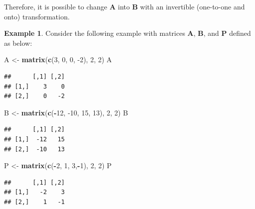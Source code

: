 \documentclass[
]{book}
\newenvironment{Shaded}{\begin{snugshade}}{\end{snugshade}}
\newcommand{\DecValTok}[1]{\textcolor[rgb]{0.00,0.00,0.81}{#1}}
\newcommand{\KeywordTok}[1]{\textcolor[rgb]{0.13,0.29,0.53}{\textbf{#1}}}
\newcommand{\NormalTok}[1]{#1}
\newcommand{\OperatorTok}[1]{\textcolor[rgb]{0.81,0.36,0.00}{\textbf{#1}}}
\newcommand{\StringTok}[1]{\textcolor[rgb]{0.31,0.60,0.02}{#1}}
\theoremstyle{definition}
\theoremstyle{definition}
\newtheorem{example}{Example}[chapter]
\theoremstyle{definition}
\theoremstyle{definition}
\theoremstyle{remark}
\begin{document}
Therefore, it is possible to change \(\mathbf{A}\) into \(\mathbf{B}\) with an invertible (one-to-one and onto) transformation.

\begin{example}

Consider the following example with matrices \(\mathbf{A}\), \(\mathbf{B}\), and \(\mathbf{P}\) defined as below:

\begin{Shaded}
\begin{Highlighting}[]
\NormalTok{A <-}\StringTok{ }\KeywordTok{matrix}\NormalTok{(}\KeywordTok{c}\NormalTok{(}\DecValTok{3}\NormalTok{, }\DecValTok{0}\NormalTok{, }\DecValTok{0}\NormalTok{, }\DecValTok{-2}\NormalTok{), }\DecValTok{2}\NormalTok{, }\DecValTok{2}\NormalTok{)}
\NormalTok{A}
\end{Highlighting}
\end{Shaded}

\begin{verbatim}
##      [,1] [,2]
## [1,]    3    0
## [2,]    0   -2
\end{verbatim}

\begin{Shaded}
\begin{Highlighting}[]
\NormalTok{B <-}\StringTok{ }\KeywordTok{matrix}\NormalTok{(}\KeywordTok{c}\NormalTok{(}\OperatorTok{-}\DecValTok{12}\NormalTok{, }\DecValTok{-10}\NormalTok{, }\DecValTok{15}\NormalTok{, }\DecValTok{13}\NormalTok{), }\DecValTok{2}\NormalTok{, }\DecValTok{2}\NormalTok{)}
\NormalTok{B}
\end{Highlighting}
\end{Shaded}

\begin{verbatim}
##      [,1] [,2]
## [1,]  -12   15
## [2,]  -10   13
\end{verbatim}

\begin{Shaded}
\begin{Highlighting}[]
\NormalTok{P <-}\StringTok{ }\KeywordTok{matrix}\NormalTok{(}\KeywordTok{c}\NormalTok{(}\OperatorTok{-}\DecValTok{2}\NormalTok{, }\DecValTok{1}\NormalTok{, }\DecValTok{3}\NormalTok{,}\OperatorTok{-}\DecValTok{1}\NormalTok{), }\DecValTok{2}\NormalTok{, }\DecValTok{2}\NormalTok{)}
\NormalTok{P}
\end{Highlighting}
\end{Shaded}

\begin{verbatim}
##      [,1] [,2]
## [1,]   -2    3
## [2,]    1   -1
\end{verbatim}


\end{example}
\end{document}
